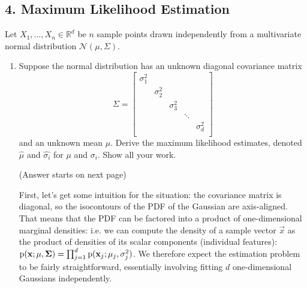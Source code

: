 \documentclass{article}
\renewcommand{\N}{\mathcal{N}}
\renewcommand{\R}{\mathbb{R}}
\renewcommand{\hat}{\widehat}
\begin{document}
\newpage
\subsection*{4. Maximum Likelihood Estimation}
Let $X_1, \ldots, X_n \in \R^d$ be $n$ sample points drawn independently from a multivariate normal distribution $\N(\mu, \Sigma)$.
\begin{enumerate}[label=(\alph*)]
    \item Suppose the normal distribution has an unknown diagonal covariance matrix
    $$
    \Sigma =
    \begin{bmatrix}
    \sigma_1^2 & & & & \\
    & \sigma_2^2 & & & \\
    & & \sigma_3^2 & & \\
    & & & \ddots & \\
    & & & & \sigma_d^2 \\
    \end{bmatrix}
    $$
    and an unknown mean $\mu$. Derive the maximum likelihood estimates, denoted
    $\hat{\mu}$ and $\hat{\sigma_i}$ for $\mu$ and $\sigma_i$. Show all your
    work.

    (Answer starts on next page)

    \begin{mdframed}
      First, let's get some intuition for the situation: the covariance matrix
      is diagonal, so the isocontours of the PDF of the Gaussian are
      axis-aligned. That means that the PDF can be factored into a product of
      one-dimensional marginal densities: i.e. we can compute the density of a
      sample vector $\vec x$ as the product of densities of its scalar
      components (individual features):
      $\operatorname{\text{p}}(\mathbf x;\mathbf \mu, \mathbf \Sigma) = \prod_{j=1}^d \operatorname{\text{p}}(\mathbf x_j; \mu_j,
      \sigma^2_j)$. We therefore expect the estimation problem to be fairly
      straightforward, essentially involving fitting $d$ one-dimensional
      Gaussians independently.


\end{mdframed}
\end{enumerate}
\end{document}
